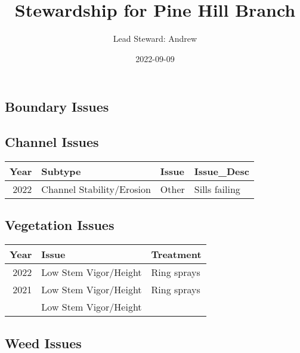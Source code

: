 \documentclass[
  landscape]{article}
\title{Stewardship for Pine Hill Branch}
\author{Lead Steward: Andrew}
\date{2022-09-09}
\begin{document}
\maketitle

\hypertarget{boundary-issues}{%
\subsection{Boundary Issues}\label{boundary-issues}}

\textbar\textbar{} \textbar\textbar{} \textbar\textbar{}
\textbar\textbar{}

\hypertarget{channel-issues}{%
\subsection{Channel Issues}\label{channel-issues}}

\begin{longtable}[]{@{}rlll@{}}
\toprule()
Year & Subtype & Issue & Issue\_Desc \\
\midrule()
\endhead
2022 & Channel Stability/Erosion & Other & Sills failing \\
\bottomrule()
\end{longtable}

\hypertarget{vegetation-issues}{%
\subsection{Vegetation Issues}\label{vegetation-issues}}

\begin{longtable}[]{@{}rll@{}}
\toprule()
Year & Issue & Treatment \\
\midrule()
\endhead
2022 & Low Stem Vigor/Height & Ring sprays \\
2021 & Low Stem Vigor/Height & Ring sprays \\
& Low Stem Vigor/Height & \\
\bottomrule()
\end{longtable}

\hypertarget{weed-issues}{%
\subsection{Weed Issues}\label{weed-issues}}
\end{document}
